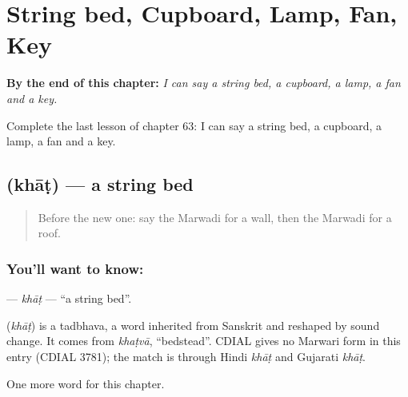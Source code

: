 
\chapter{String bed, Cupboard, Lamp, Fan, Key}
\label{ch:mw-string-bed-cupboard-lamp-fan-key}

\begin{chapteropening}
\textbf{By the end of this chapter:} \emph{I can say a string bed, a cupboard, a lamp, a fan and a key.}

Complete the last lesson of chapter 63: I can say a string bed, a cupboard, a lamp, a fan and a key.
\end{chapteropening}

\section[\texorpdfstring{\mw{खाट} (khāṭ)}{खाट (khāṭ)}]{ (khāṭ) — a string bed}

\label{lesson:MW-C63-khat}



\begin{quote}
Before the new one: say the Marwadi for a wall, then the Marwadi for a roof.
\end{quote}

\subsection*{You'll want to know: }
\textbf{} — \emph{khāṭ} — \textquotedblleft{}a string bed\textquotedblright{}.

\begin{cousinweb}
\textbf{} (\emph{khāṭ}) is a tadbhava, a word inherited from Sanskrit and reshaped by sound change. It comes from \emph{khaṭvā}, \textquotedblleft{}bedstead\textquotedblright{}. CDIAL gives no Marwari form in this entry (CDIAL 3781); the match is through Hindi \emph{khāṭ} and Gujarati \emph{khāṭ}.
\end{cousinweb}

\begin{grammarlens}[title={What you've built}]
One more word for this chapter.
\end{grammarlens}

